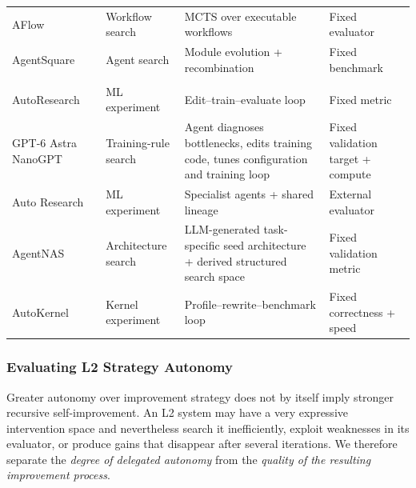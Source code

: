 \begin{table}[t]
\begin{tabularx}{0.9\textwidth}{@{}>{\raggedright\arraybackslash}p{}>{\raggedright\arraybackslash}p{}>{\raggedright\arraybackslash}p{}>{\raggedright\arraybackslash}X@{}}
AFlow~\cite{zhang2025aflow}
& Workflow search
& MCTS over executable workflows
& Fixed evaluator \\

AgentSquare~\cite{shang2025agentsquare}
& Agent search
& Module evolution + recombination
& Fixed benchmark \\
\midrule

\multicolumn{4}{@{}l}{\textbf{Autonomous Experimental Search}}\\

AutoResearch~\cite{karpathy2026autoresearch}
& ML experiment
& Edit--train--evaluate loop
& Fixed metric \\

GPT-6 Astra NanoGPT~\cite{openai2026gpt6astra}
& Training-rule search
& Agent diagnoses bottlenecks, edits training code, tunes configuration and training loop
& Fixed validation target + compute \\

Auto Research~\cite{ning2026autoresearch}
& ML experiment
& Specialist agents + shared lineage
& External evaluator \\

AgentNAS~\cite{jeong2026agentnas}
& Architecture search
& LLM-generated task-specific seed architecture + derived structured search space
& Fixed validation metric \\

AutoKernel~\cite{jaber2026autokernel}
& Kernel experiment
& Profile--rewrite--benchmark loop
& Fixed correctness + speed \\

\bottomrule
\end{tabularx}
\end{table}


\subsubsection{Evaluating L2 Strategy Autonomy}
Greater autonomy over improvement strategy does not by itself imply stronger recursive self-improvement. An L2 system may have a very expressive intervention space and nevertheless search it inefficiently, exploit weaknesses in its evaluator, or produce gains that disappear after several iterations. We therefore separate the \emph{degree of delegated autonomy} from the \emph{quality of the resulting improvement process}.

